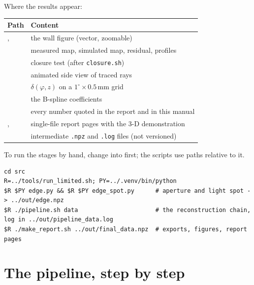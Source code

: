 \documentclass[11pt,a4paper]{article}
\newcommand{\code}[1]{\texttt{#1}}
\begin{document}
Where the results appear:

\begin{tabularx}{\textwidth}{@{}L{5.6cm}Y@{}}
\toprule
Path & Content \\
\midrule
{},  & the wall figure (vector, zoomable) \\
 & measured map, simulated map, residual, profiles \\
 & closure test (after \code{closure.sh}) \\
 & animated side view of traced rays \\
 & $\delta(\varphi,z)$ on a $1^\circ\times0.5$\,mm grid \\
 & the B-spline coefficients \\
 & every number quoted in the report and in this manual \\
,  & single-file report pages with the 3-D demonstration \\
 & intermediate \code{.npz} and \code{.log} files (not versioned) \\
\bottomrule
\end{tabularx}

To run the stages by hand, change into  first; the scripts use paths relative to it.
\begin{lstlisting}
cd src
R=../tools/run_limited.sh; PY=../.venv/bin/python
$R $PY edge.py && $R $PY edge_spot.py      # aperture and light spot -> ../out/edge.npz
$R ./pipeline.sh data                      # the reconstruction chain, log in ../out/pipeline_data.log
$R ./make_report.sh ../out/final_data.npz  # exports, figures, report pages
\end{lstlisting}

\section{The pipeline, step by step}
\label{sec:pipeline}
\end{document}
